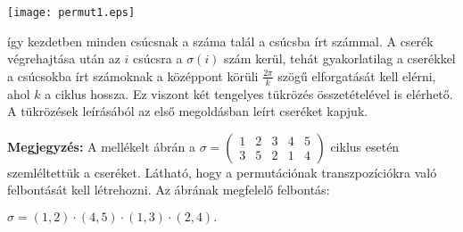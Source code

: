\documentclass[a4paper,10pt]{article}
\begin{document}
\centerline{\texttt{[image: permut1.eps]}}

így kezdetben minden csúcsnak a száma talál a csúcsba
írt számmal. A cserék végrehajtása után az $i$ csúcsra
a $\sigma(i)$ szám kerül, tehát gyakorlatilag a cserékkel a
csúcsokba írt számoknak a középpont körüli
$\frac{2\pi}{k}$ szögű elforgatását kell elérni, ahol $k$
a ciklus hossza. Ez viszont két tengelyes tükrözés
összetételével is elérhető. A tükrözések
leírásából az első megoldásban leírt cseréket
kapjuk.

\medskip

\textbf{Megjegyzés: } A mellékelt ábrán a $\sigma=\left (\begin{array}{ccccc} 1&2&3&4&5\\ 3&5&2&1&4 \end{array} \right )$
ciklus esetén szemléltettük a cseréket. Látható, hogy a
permutációnak transzpozíciókra való felbontását kell
létrehozni. Az ábrának megfelelő felbontás:

\centerline{$\sigma=(1,2)\cdot(4,5)\cdot(1,3)\cdot(2,4).$}
\end{document}
